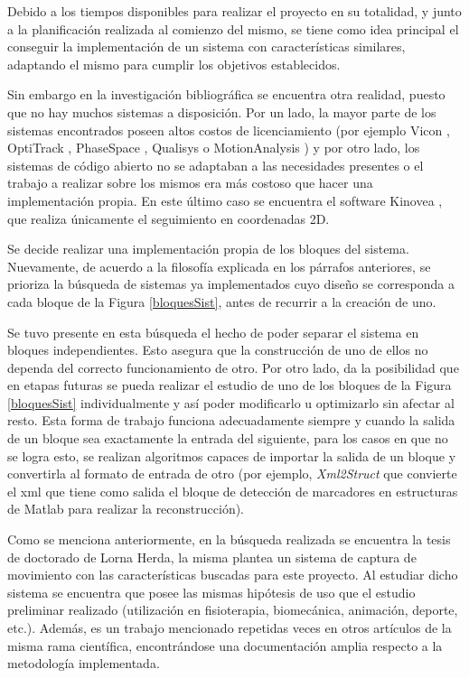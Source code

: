 Debido a los tiempos disponibles para realizar el proyecto en su totalidad, y junto a la planificación realizada al comienzo del mismo, se tiene como idea principal el conseguir la implementación de un sistema con características similares, adaptando el mismo para cumplir los objetivos establecidos. 

Sin embargo en la investigación bibliográfica se encuentra otra realidad, puesto que no hay muchos sistemas a disposición. Por un lado, la mayor parte de los sistemas encontrados poseen altos costos de licenciamiento (por ejemplo Vicon \cite{vicon}, OptiTrack \cite{optitrack}, PhaseSpace \cite{phasespace}, Qualisys \cite{qualisys} o MotionAnalysis \cite{motion_analysis}) y por otro lado, los sistemas de código abierto no se adaptaban a las necesidades presentes o el trabajo a realizar sobre los mismos era más costoso que hacer una implementación propia. En este último caso se encuentra el software Kinovea \cite{kinovea}, que realiza únicamente el seguimiento en coordenadas 2D.

Se decide realizar una implementación propia de los bloques del sistema. Nuevamente, de acuerdo a la filosofía explicada en los párrafos anteriores, se prioriza la búsqueda de sistemas ya implementados cuyo diseño se corresponda a cada bloque de la Figura \ref{bloquesSist},  antes de recurrir a la creación de uno.

Se tuvo presente en esta búsqueda el hecho de poder separar el sistema en bloques independientes. Esto asegura que la construcción de uno de ellos no dependa del correcto funcionamiento de otro. Por otro lado, da la posibilidad que en etapas futuras se pueda realizar el estudio de uno de los bloques de la Figura \ref{bloquesSist} individualmente y así poder modificarlo u optimizarlo sin afectar al resto. Esta forma de trabajo funciona adecuadamente siempre y cuando la salida de un bloque sea exactamente la entrada del siguiente, para los casos en que no se logra esto, se realizan algoritmos capaces de importar la salida de un bloque y convertirla al formato de entrada de otro (por ejemplo, \textit{Xml2Struct} que convierte el xml que tiene como salida el bloque de detección de marcadores en estructuras de Matlab para realizar la reconstrucción).

Como se menciona anteriormente, en la búsqueda realizada se encuentra la tesis de doctorado de Lorna Herda\cite{herda}, la misma plantea un sistema de captura de movimiento con las características buscadas para este proyecto. Al estudiar dicho sistema se encuentra que posee las mismas hipótesis de uso que el estudio preliminar realizado (utilización en fisioterapia, biomecánica, animación, deporte, etc.). Además, es un trabajo mencionado repetidas veces en otros artículos de la misma rama científica, encontrándose una documentación amplia respecto a la metodología implementada.

